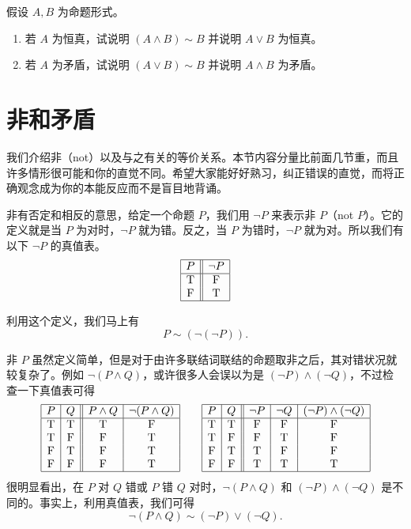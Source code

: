 \begin{question}
假设 \(A, B\) 为命题形式。
\begin{enumerate}
    \item 若 \(A\) 为恒真，试说明 \((A \land B) \sim B\) 并说明 \(A \lor B\) 为恒真。
    \item 若 \(A\) 为矛盾，试说明 \((A \lor B) \sim B\) 并说明 \(A \land B\) 为矛盾。
\end{enumerate}
\end{question}

\section{非和矛盾}

我们介绍非（not）以及与之有关的等价关系。本节内容分量比前面几节重，而且许多情形很可能和你的直觉不同。希望大家能好好熟习，纠正错误的直觉，而将正确观念成为你的本能反应而不是盲目地背诵。

非有否定和相反的意思，给定一个命题 \(P\)，我们用 \(\neg P\) 来表示非 \(P\)（not $P$）。它的定义就是当 \(P\) 为对时，\(\neg P\) 就为错。反之，当 \(P\) 为错时，\(\neg P\) 就为对。所以我们有以下 \(\neg P\) 的真值表。
\[
\begin{array}{|c||c|}
\hline
P & \neg P \\
\hline
\mathrm{T} & \mathrm{F} \\
\mathrm{F} & \mathrm{T} \\
\hline
\end{array}
\]

利用这个定义，我们马上有
\[
P \sim (\neg (\neg P)). \tag{1.7}
\]

非 \(P\) 虽然定义简单，但是对于由许多联结词联结的命题取非之后，其对错状况就较复杂了。例如 \(\neg (P \land Q)\)，或许很多人会误以为是 \((\neg P) \land (\neg Q)\)，不过检查一下真值表可得
\[
\begin{array}{|c|c||c|c|}
\hline
P & Q & P\land Q & \neg(P\land Q) \\
\hline
\mathrm{T} & \mathrm{T} & \mathrm{T} & \mathrm{F} \\
\mathrm{T} & \mathrm{F} & \mathrm{F} & \mathrm{T} \\
\mathrm{F} & \mathrm{T} & \mathrm{F} & \mathrm{T} \\
\mathrm{F} & \mathrm{F} & \mathrm{F} & \mathrm{T} \\
\hline
\end{array}
\qquad
\begin{array}{|c|c||c|c|c|}
\hline
 P & Q & \neg P & \neg Q & (\neg P)\land (\neg Q) \\
\hline
 \mathrm{T} & \mathrm{T} & \mathrm{F} & \mathrm{F} & \mathrm{F} \\
 \mathrm{T} & \mathrm{F} & \mathrm{F} & \mathrm{T} & \mathrm{F} \\
 \mathrm{F} & \mathrm{T} & \mathrm{T} & \mathrm{F} & \mathrm{F} \\
 \mathrm{F} & \mathrm{F} & \mathrm{T} & \mathrm{T} & \mathrm{T} \\
\hline
\end{array}
\]
很明显看出，在 \(P\) 对 \(Q\) 错或 \(P\) 错 \(Q\) 对时，\(\neg (P \land Q)\) 和 \((\neg P) \land (\neg Q)\) 是不同的。事实上，利用真值表，我们可得
\[
\neg (P \land Q) \sim (\neg P) \lor (\neg Q). \tag{1.8}
\]

